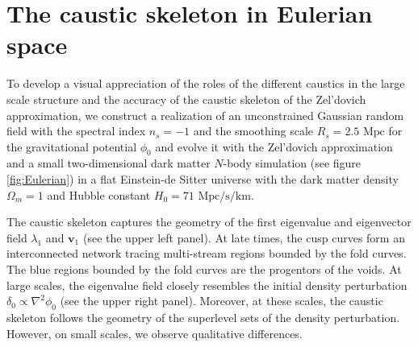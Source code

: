 \documentclass[a4paper, 11pt]{article}
\begin{document}
\section{The caustic skeleton in Eulerian space}
To develop a visual appreciation of the roles of the different caustics in the large scale structure and the accuracy of the caustic skeleton of the Zel'dovich approximation, we construct a realization of an unconstrained Gaussian random field with the spectral index $n_s=-1$ and the smoothing scale $R_s=2.5 \text{ Mpc}$ for the gravitational potential $\phi_0$ and evolve it with the Zel'dovich approximation and a small two-dimensional dark matter $N$-body simulation \cite{Hidding:2020} (see figure \ref{fig:Eulerian}) in a flat Einstein-de Sitter universe with the dark matter density $\Omega_m=1$ and Hubble constant $H_0=71\text{ Mpc/s/km}$. 

The caustic skeleton captures the geometry of the first eigenvalue and eigenvector field $\lambda_1$ and $\bm{v}_1$ (see the upper left panel). At late times, the cusp curves form an interconnected network tracing multi-stream regions bounded by the fold curves. The blue regions bounded by the fold curves are the progentors of the voids. At large scales, the eigenvalue field closely resembles the initial density perturbation $\delta_0 \propto \nabla^2\phi_0$ (see the upper right panel). Moreover, at these scales, the caustic skeleton follows the geometry of the superlevel sets of the density perturbation. However, on small scales, we observe qualitative differences. 
\end{document}
